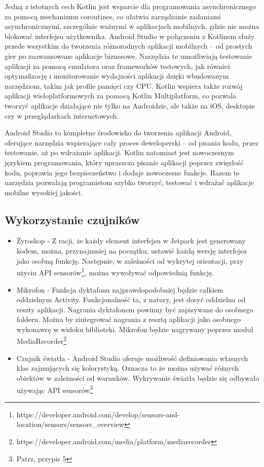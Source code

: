 Jedną z istotnych cech Kotlin jest wsparcie dla programowania asynchronicznego za pomocą mechanizmu coroutines, co ułatwia zarządzanie zadaniami asynchronicznymi, szczególnie ważnymi w aplikacjach mobilnych, gdzie nie można blokować interfejsu użytkownika. Android Studio w połączeniu z Kotlinem służy przede wszystkim do tworzenia różnorodnych aplikacji mobilnych – od prostych gier po zaawansowane aplikacje biznesowe. Narzędzia te umożliwiają testowanie aplikacji za pomocą emulatora oraz frameworków testowych, jak również optymalizację i monitorowanie wydajności aplikacji dzięki wbudowanym narzędziom, takim jak profile pamięci czy CPU. Kotlin wspiera także rozwój aplikacji wieloplatformowych za pomocą Kotlin Multiplatform, co pozwala tworzyć aplikacje działające nie tylko na Androidzie, ale także na iOS, desktopie czy w przeglądarkach internetowych.

Android Studio to kompletne środowisko do tworzenia aplikacji Android, oferujące narzędzia wspierające cały proces deweloperski – od pisania kodu, przez testowanie, aż po wdrażanie aplikacji. Kotlin natomiast jest nowoczesnym językiem programowania, który upraszcza pisanie aplikacji poprzez zwięzłość kodu, poprawia jego bezpieczeństwo i dodaje nowoczesne funkcje. Razem te narzędzia pozwalają programistom szybko tworzyć, testować i wdrażać aplikacje mobilne wysokiej jakości.

\subsection{Wykorzystanie czujników}

\begin{itemize}
	\item Żyroskop - Z racji, że każdy element interfejsu w Jetpack jest generowany kodem, można, przynajmniej na początku, ustawić każdą wersję interfejsu jako osobną funkcję. Następnie, w zależności od wykrytej orientacji, przy użyciu API sensorów\footnote{https://developer.android.com/develop/sensors-and-location/sensors/sensors\_overview}, można wywoływać odpowiednią funkcję.
	
	\item Mikrofon - Funkcja dyktafonu najprawdopodobniej będzie całkiem oddzielnym Activity. Funkcjonalność ta, z natury, jest dosyć oddzielna od reszty aplikacji. Nagrania dyktafonem powinny być zapisywane do osobnego folderu. Można by zintegrować nagrania z resztą aplikacji jako osobnego wykonawcę w widoku biblioteki. Mikrofon będzie nagrywany poprzez moduł MediaRecorder\footnote{https://developer.android.com/media/platform/mediarecorder}

	\item Czujnik światła - Android Studio oferuje możliwość definiowania własnych klas zajmujących się kolorystyką. Oznacza to że można używać różnych obiektów w zależności od warunków. Wykrywanie światła będzie się odbywało używając API sensorów\footnote{Patrz, przypis 5} %
\end{itemize}


